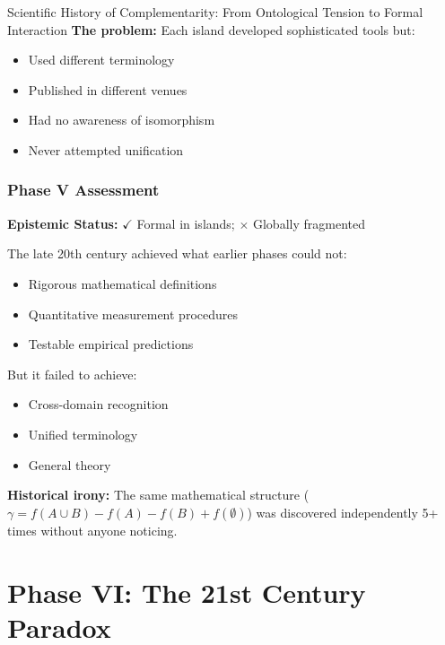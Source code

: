 \begin{chapter}{Scientific History of Complementarity: From Ontological Tension to Formal Interaction}
\textbf{The problem:} Each island developed sophisticated tools but:
\begin{itemize}[noitemsep]
    \item Used different terminology
    \item Published in different venues
    \item Had no awareness of isomorphism
    \item Never attempted unification
\end{itemize}

\subsubsection{Phase V Assessment}

\begin{tcolorbox}[colback=purple!5!white,colframe=purple!75!black,title=\textbf{Phase V Verdict}]
\textbf{Epistemic Status:} $\checkmark$ Formal in islands; $\times$ Globally fragmented

The late 20th century achieved what earlier phases could not:
\begin{itemize}[noitemsep]
    \item Rigorous mathematical definitions
    \item Quantitative measurement procedures
    \item Testable empirical predictions
\end{itemize}

But it failed to achieve:
\begin{itemize}[noitemsep]
    \item Cross-domain recognition
    \item Unified terminology
    \item General theory
\end{itemize}

\textbf{Historical irony:} The same mathematical structure ($\gamma = f(A \cup B) - f(A) - f(B) + f(\emptyset)$) was discovered independently 5+ times without anyone noticing.
\end{tcolorbox}

\section{Phase VI: The 21st Century Paradox}
\label{sec:phase-vi}


\end{chapter}
